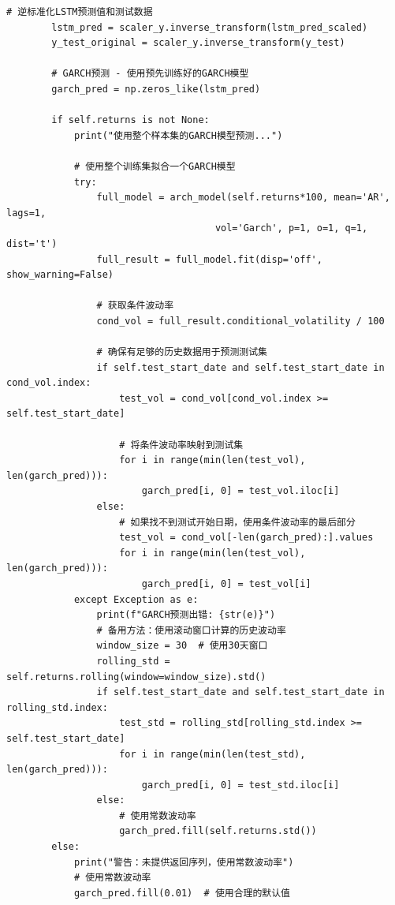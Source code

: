 \documentclass[12pt, a4paper]{article}
\begin{document}
\begin{lstlisting}[basicstyle=\small\ttfamily, breaklines=true, columns=fullflexible]
        # 逆标准化LSTM预测值和测试数据
        lstm_pred = scaler_y.inverse_transform(lstm_pred_scaled)
        y_test_original = scaler_y.inverse_transform(y_test)
        
        # GARCH预测 - 使用预先训练好的GARCH模型
        garch_pred = np.zeros_like(lstm_pred)
        
        if self.returns is not None:
            print("使用整个样本集的GARCH模型预测...")
            
            # 使用整个训练集拟合一个GARCH模型
            try:
                full_model = arch_model(self.returns*100, mean='AR', lags=1, 
                                     vol='Garch', p=1, o=1, q=1, dist='t')
                full_result = full_model.fit(disp='off', show_warning=False)
                
                # 获取条件波动率
                cond_vol = full_result.conditional_volatility / 100
                
                # 确保有足够的历史数据用于预测测试集
                if self.test_start_date and self.test_start_date in cond_vol.index:
                    test_vol = cond_vol[cond_vol.index >= self.test_start_date]
                    
                    # 将条件波动率映射到测试集
                    for i in range(min(len(test_vol), len(garch_pred))):
                        garch_pred[i, 0] = test_vol.iloc[i]
                else:
                    # 如果找不到测试开始日期，使用条件波动率的最后部分
                    test_vol = cond_vol[-len(garch_pred):].values
                    for i in range(min(len(test_vol), len(garch_pred))):
                        garch_pred[i, 0] = test_vol[i]
            except Exception as e:
                print(f"GARCH预测出错: {str(e)}")
                # 备用方法：使用滚动窗口计算的历史波动率
                window_size = 30  # 使用30天窗口
                rolling_std = self.returns.rolling(window=window_size).std()
                if self.test_start_date and self.test_start_date in rolling_std.index:
                    test_std = rolling_std[rolling_std.index >= self.test_start_date]
                    for i in range(min(len(test_std), len(garch_pred))):
                        garch_pred[i, 0] = test_std.iloc[i]
                else:
                    # 使用常数波动率
                    garch_pred.fill(self.returns.std())
        else:
            print("警告：未提供返回序列，使用常数波动率")
            # 使用常数波动率
            garch_pred.fill(0.01)  # 使用合理的默认值
        

\end{lstlisting}
\end{document}
